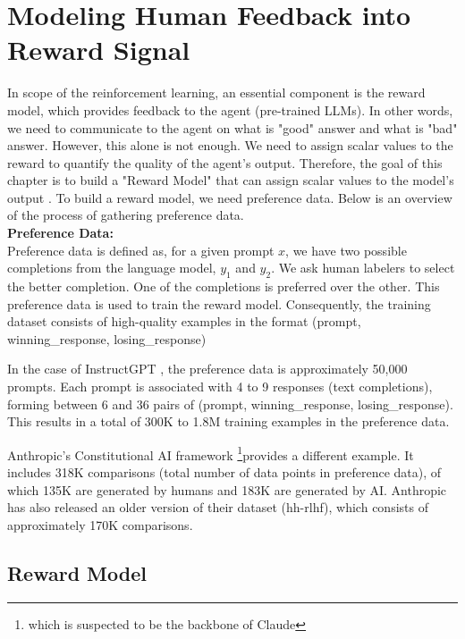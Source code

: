 \section{Modeling Human Feedback into Reward Signal}
\label{sec:model-reward}

In scope of the reinforcement learning, an essential component is the  
reward model, which provides feedback to the agent (pre-trained LLMs). 
In other words, we need to communicate to the agent on what is "good" answer 
and what is "bad" answer. However, this alone is not enough. We need to assign scalar 
values to the reward to quantify the quality of the agent's output. 
Therefore, the goal of this chapter is to build a "Reward Model" that can
assign scalar values to the model's output \cite{christianoDeepReinforcementLearning2017}.
To build a reward model, we need preference data. Below is an overview of the process of gathering preference data. \\


\textbf{Preference Data:}\\

Preference data is defined as, for a given prompt $x$, we have two possible completions from the language model, $y_1$ and $y_2$. We ask human labelers to select the better completion. One of the completions is preferred over the other. This preference data is used to train the reward model. Consequently, the training dataset consists of high-quality examples in the format (prompt, winning\_response, losing\_response)

In the case of InstructGPT \cite{ouyangTrainingLanguageModels2022}, the preference data is approximately 50,000 prompts. Each prompt is associated with 4 to 9 responses (text completions), forming between 6 and 36 pairs of (prompt, winning\_response, losing\_response). This results in a total of 300K to 1.8M training examples in the preference data.


Anthropic's Constitutional AI framework \footnote{which is suspected to be the backbone of Claude}provides a different example. It includes 318K comparisons (total number of data points in preference data), of which 135K are generated by humans and 183K are generated by AI. Anthropic has also released an older version of their dataset (hh-rlhf), which consists of approximately 170K comparisons.


\subsection{Reward Model} \label{subsec:reward-model}

